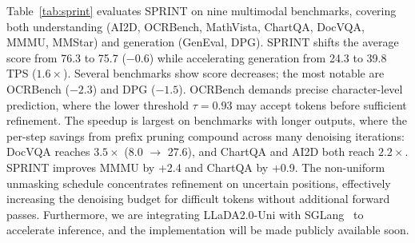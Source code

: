 \begin{table}[!b]
\centering
\vspace{-0.18in}
\renewcommand{\arraystretch}{1.22}
\caption{Performance and TPS comparison with and without SPRINT. (w/o SGLang)}
\label{tab:sprint}
\end{table}

Table~\ref{tab:sprint} evaluates SPRINT on nine multimodal benchmarks, covering both understanding (AI2D, OCRBench, MathVista, ChartQA, DocVQA, MMMU, MMStar) and generation (GenEval, DPG). 
%
SPRINT shifts the average score from 76.3 to 75.7 ($-$0.6) while accelerating generation from 24.3 to 39.8 TPS ($1.6\times$). 
%
Several benchmarks show score decreases; the most notable are OCRBench ($-2.3$) and DPG ($-1.5$).
%
OCRBench demands precise character-level prediction, where the lower threshold $\tau = 0.93$ may accept tokens before sufficient refinement. 
%
The speedup is largest on benchmarks with longer outputs, where the per-step savings from prefix pruning compound across many denoising iterations: DocVQA reaches $3.5\times$ (8.0 $\to$ 27.6), and ChartQA and AI2D both reach $2.2\times$.
%
SPRINT improves MMMU by +2.4 and ChartQA by +0.9. 
%
The non-uniform unmasking schedule concentrates refinement on uncertain positions, effectively increasing the denoising budget for difficult tokens without additional forward passes.
%
Furthermore, we are integrating LLaDA2.0-Uni with SGLang~\citep{Sglang} to accelerate inference, and the implementation will be made publicly available soon.
